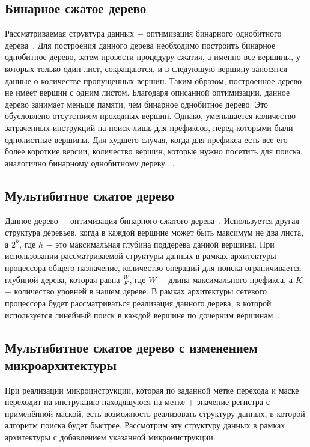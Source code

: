 \documentclass[conference]{IEEEtran}
\begin{document}
        \subsection{Бинарное сжатое дерево}
        \label{section:bctrev}
            Рассматриваемая структура данных $-$ оптимизация бинарного однобитного дерева~\cite{ruiz2001survey}. Для построения данного дерева необходимо построить бинарное однобитное дерево, 
            затем провести процедуру сжатия, а именно все вершины, у которых только один лист, сокращаются, и в следующую вершину заносятся данные о 
            количестве пропущенных вершин. Таким образом, построенное дерево не имеет вершин с одним листом. Благодаря описанной оптимизации, данное дерево
            занимает меньше памяти, чем бинарное однобитное дерево. Это обусловлено отсутствием проходных вершин. Однако, уменьшается количество затраченных инструкций на поиск лишь 
            для префиксов, перед которыми были однолистные вершины. Для худшего случая, когда для префикса есть все его более короткие версии, количество вершин, 
            которые нужно посетить для поиска, аналогично бинарному однобитному дереву ~\cite{ruiz2001survey}. 

        \subsection{Мультибитное сжатое дерево}
            Данное дерево $-$ оптимизация бинарного сжатого дерева~\cite{berger2003ip}.
            Используется другая структура деревьев, когда в каждой вершине может быть максимум не два листа, 
            а {\ttfamily $2^h$}, где {\ttfamily $h$} $-$ это максимальная глубина поддерева данной вершины.
            При использовании рассматриваемой структуры данных в рамках архитектуры процессора общего назначение, количество операций для поиска ограничивается глубиной дерева,
            которая равна {\ttfamily $\frac{W}{K}$}, где {\ttfamily $W$} $-$ длина максимального префикса, а {\ttfamily $K$} $-$ количество уровней в нашем дереве.
            В рамках архитектуры сетевого процессора будет рассматриваться реализация данного дерева, в которой используется линейный поиск в каждой вершине по дочерним вершинам~\cite{berger2003ip}.
        
        \subsection{Мультибитное сжатое дерево с изменением микроархитектуры}
            При реализации микроинструкции, которая по заданной метке перехода и маске переходит на инструкцию находящуюся на метке + значение регистра с применённой маской,
            есть возможность реализовать структуру данных, в которой алгоритм поиска будет быстрее. Рассмотрим эту структуру данных в рамках архитектуры с добавлением указанной микроинструкции.\\
        
\end{document}
